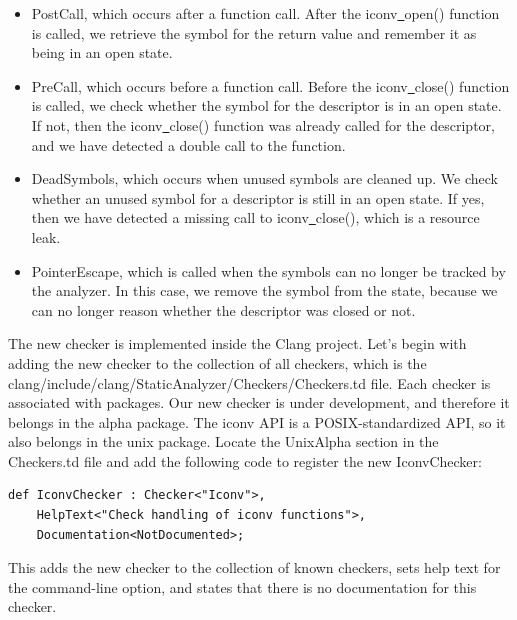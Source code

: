 \begin{itemize}
\item PostCall, which occurs after a function call. After the iconv\underline{~}open() function is called, we retrieve the symbol for the return value and remember it as being in an open state.

\item PreCall, which occurs before a function call. Before the iconv\underline{~}close() function is called, we check whether the symbol for the descriptor is in an open state. If not, then the iconv\underline{~}close() function was already called for the descriptor, and we have detected a double call to the function.

\item DeadSymbols, which occurs when unused symbols are cleaned up. We check whether an unused symbol for a descriptor is still in an open state. If yes, then we have detected a missing call to iconv\underline{~}close(), which is a resource leak.

\item PointerEscape, which is called when the symbols can no longer be tracked by the analyzer. In this case, we remove the symbol from the state, because we can no longer reason whether the descriptor was closed or not.

\end{itemize}

The new checker is implemented inside the Clang project. Let's begin with adding the new checker to the collection of all checkers, which is the clang/include/clang/StaticAnalyzer/Checkers/Checkers.td file. Each checker is associated with packages. Our new checker is under development, and therefore it belongs in the alpha package. The iconv API is a POSIX-standardized API, so it also belongs in the unix package. Locate the UnixAlpha section in the Checkers.td file and add the following code to register the new IconvChecker:\par

\begin{lstlisting}[caption={}]
def IconvChecker : Checker<"Iconv">,
	HelpText<"Check handling of iconv functions">,
	Documentation<NotDocumented>;
\end{lstlisting}

This adds the new checker to the collection of known checkers, sets help text for the command-line option, and states that there is no documentation for this checker.\par

